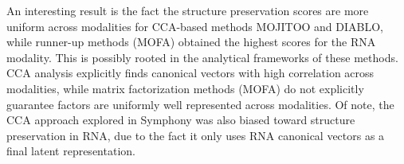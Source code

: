An interesting result is the fact the structure preservation scores are more uniform across modalities for CCA-based methods MOJITOO and DIABLO, while runner-up methods (MOFA) obtained the highest scores for the RNA modality. This is possibly rooted in the analytical frameworks of these methods. CCA analysis explicitly finds canonical vectors with high correlation across modalities, while matrix factorization methods (MOFA) do not explicitly guarantee factors are uniformly well represented across modalities. Of note, the CCA approach explored in Symphony was also biased toward structure preservation in RNA, due to the fact it only uses RNA canonical vectors as a final latent representation.
